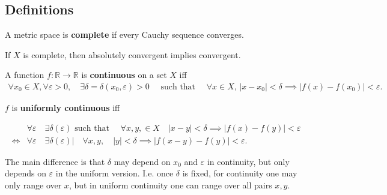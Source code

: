 \hypertarget{definitions}{%
\subsection{Definitions}\label{definitions}}

\begin{definition}[Completeness]

A metric space is \textbf{complete} if every Cauchy sequence converges.

\end{definition}

\begin{fact}

If \(X\) is complete, then absolutely convergent implies convergent.

\end{fact}

\begin{definition}

A function \(f: {\mathbb{R}}\to {\mathbb{R}}\) is \textbf{continuous} on
a set \(X\) iff
\begin{align*}
\forall x_0 \in X, \forall {\varepsilon}>0, \quad \exists\delta = \delta(x_0, {\varepsilon}) >0 \quad\text{ such that }\quad \forall x\in X, \, {\left\lvert {x-x_0} \right\rvert}<\delta \implies {\left\lvert {f(x) - f(x_0)} \right\rvert} < {\varepsilon}
.\end{align*}

\(f\) is \textbf{uniformly continuous} iff

\begin{align*}
  &\forall \varepsilon \quad \exists \delta(\varepsilon) \text{ such that }\quad \forall x, y, \in X \quad {\left\lvert {x - y} \right\rvert} < \delta \implies {\left\lvert {f(x) - f(y)} \right\rvert} < \varepsilon \\
\iff &\forall \varepsilon \quad \exists \delta(\varepsilon) \mathrel{\Big|}\quad \forall x, y, \quad {\left\lvert {y} \right\rvert} < \delta \implies {\left\lvert {f(x-y) - f(y)} \right\rvert} < \varepsilon
.\end{align*}

\end{definition}

\begin{remark}

The main difference is that \(\delta\) may depend on \(x_0\) and
\({\varepsilon}\) in continuity, but only depends on \({\varepsilon}\)
in the uniform version. I.e. once \(\delta\) is fixed, for continuity
one may only range over \(x\), but in uniform continuity one can range
over all pairs \(x,y\).

\end{remark}

